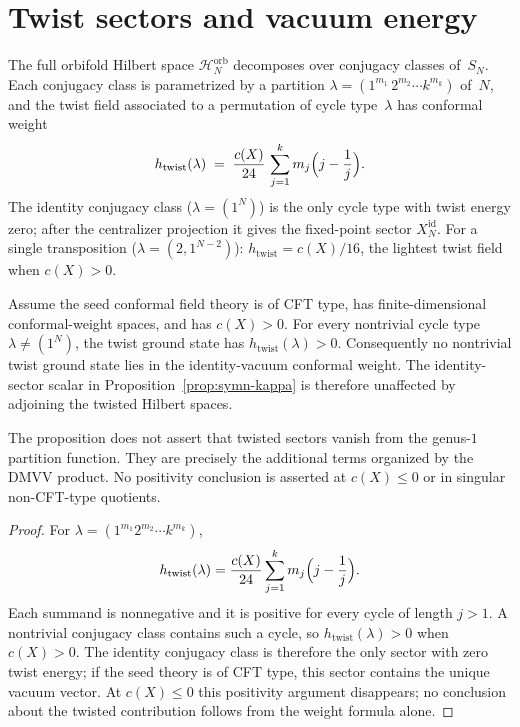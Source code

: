 
\section{Twist sectors and vacuum energy}\label{sec:symn-twist-sectors}

The full orbifold Hilbert space $\mathcal H_N^{\mathrm{orb}}$
decomposes over conjugacy classes of~$S_N$. Each conjugacy class is
parametrized by
a partition $\lambda = (1^{m_1}\, 2^{m_2} \cdots k^{m_k})$ of~$N$,
and the twist field associated to a permutation of cycle type~$\lambda$
has conformal weight \cite{LuninMathur2001}
\begin{equation}\label{eq:symn-twist-weight}
 h_{\mathrm{twist}}(\lambda)
 \;=\; \frac{c(X)}{24}\, \sum_{j=1}^{k} m_j\Bigl(j - \frac{1}{j}\Bigr).
\end{equation}
The identity conjugacy class ($\lambda = (1^N)$) is the only
cycle type with twist energy zero; after the centralizer projection
it gives the fixed-point sector $X_N^{\mathrm{id}}$. For a single
transposition ($\lambda = (2, 1^{N-2})$):
$h_{\mathrm{twist}} = c(X)/16$, the lightest twist field when
$c(X)>0$.

\begin{proposition}\label{prop:symn-twist-vanishing}
Assume the seed conformal field theory is of CFT type, has
finite-dimensional conformal-weight spaces, and has $c(X)>0$. For
every nontrivial cycle type $\lambda\neq (1^N)$, the twist ground
state has $h_{\mathrm{twist}}(\lambda)>0$. Consequently no
nontrivial twist ground state lies in the identity-vacuum conformal
weight.
The identity-sector scalar in Proposition~\ref{prop:symn-kappa} is
therefore unaffected by adjoining the twisted Hilbert spaces.

The proposition does not assert that twisted sectors vanish from the
genus-$1$ partition function. They are precisely the additional
terms organized by the DMVV product. No positivity conclusion is
asserted at $c(X)\leq0$ or in singular non-CFT-type quotients.
\end{proposition}

\begin{proof}
For $\lambda=(1^{m_1}2^{m_2}\cdots k^{m_k})$,
\[
 h_{\mathrm{twist}}(\lambda)
 = \frac{c(X)}{24}\sum_{j=1}^k m_j\Bigl(j-\frac1j\Bigr).
\]
Each summand is nonnegative and it is positive for every cycle of
length $j>1$. A nontrivial conjugacy class contains such a cycle, so
$h_{\mathrm{twist}}(\lambda)>0$ when $c(X)>0$. The identity
conjugacy class is therefore the only sector with zero twist
energy; if the seed theory is of CFT type, this sector contains the
unique vacuum vector. At $c(X)\leq0$ this positivity argument
disappears; no conclusion about the twisted contribution follows
from the weight formula alone.
\end{proof}

